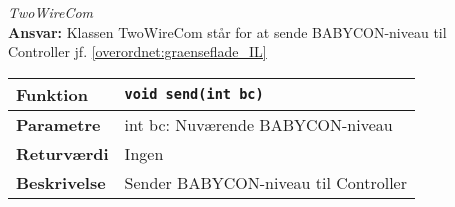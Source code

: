 \textit{TwoWireCom} \\
\textbf{Ansvar:} Klassen TwoWireCom står for at sende BABYCON-niveau til Controller jf. \ref{overordnet:graenseflade_IL}

\begin{center}
    \begin{tabular}{ | l | p{} |}
    \hline
    \textbf{Funktion}	& \verb+void send(int bc) +						\\ \hline
    \textbf{Parametre} 	& int bc: Nuværende BABYCON-niveau			\\ \hline
    \textbf{Returværdi}	& Ingen	 								\\ \hline
    \textbf{Beskrivelse}& Sender BABYCON-niveau til Controller		\\ \hline
    \end{tabular}
\end{center}


